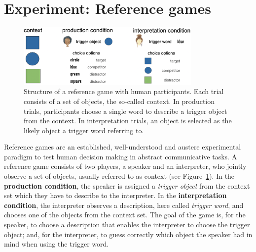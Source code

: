 \documentclass[fleqn]{article}
\begin{document}
\section{Experiment: Reference games}
\label{experiment-reference-games}

\begin{figure}
  \centering

  \includegraphics[width = 0.8\textwidth]{00-pics/reference-game.png}

  \caption{Structure of a reference game with human participants. Each trial consists of a set of objects, the so-called context. In production trials, participants choose a single word to describe a trigger object from the context. In interpretation trials, an object is selected as the likely object a trigger word referring to.}
  \label{fig:ref-game}
\end{figure}

Reference games are an established, well-understood and austere experimental paradigm to test human decision making in abstract communicative tasks.
A reference game consists of two players, a speaker and an interpreter, who jointly observe a set of objects, usually referred to as context (see Figure~\ref{fig:ref-game}).
In the \textbf{production condition}, the speaker is assigned a \emph{trigger object} from the context set which they have to describe to the interpreter.
In the \textbf{interpretation condition}, the interpreter observes a description, here called \emph{trigger word}, and chooses one of the objects from the context set.
The goal of the game is, for the speaker, to choose a description that enables the interpreter to choose the trigger object; and, for the interpreter, to guess correctly which object the speaker had in mind when using the trigger word.
\end{document}
